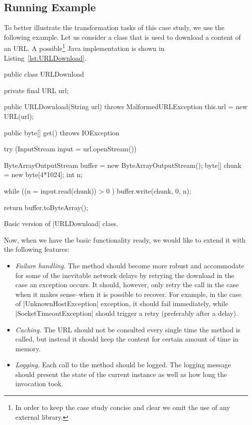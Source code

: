 \subsection{Running Example}

To better illustrate the transformation tasks of this case study, we use the following example.
Let us consider a class that is used to download a content of an URL.
A possible\footnote{In order to keep the case study concise and clear we omit the use of any external library.} Java implementation is shown in Listing~\ref{lst:URLDownload}.

\begin{listing}[H]
  \begin{javacode}
  public class URLDownload {
    private final URL url;

    public URLDownload(String url) throws MalformedURLException {
      this.url = new URL(url);
    }

    public byte[] get() throws IOException {
      try (InputStream input = url.openStream()) {

        ByteArrayOutputStream buffer = new ByteArrayOutputStream();
        byte[] chunk = new byte[4*1024];
        int n;

        while ((n = input.read(chunk)) > 0 ) {
          buffer.write(chunk, 0, n);
        }

        return buffer.toByteArray();
      }
    }
  }
  \end{javacode}
  \caption{Basic version of \javainline|URLDownload| class.}
  \label{lst:URLDownload}
\end{listing}

Now, when we have the basic functionality ready, we would like to extend it with the following features:

\begin{itemize}[--]
   \item \emph{Failure handling.} The method should become more robust and accommodate for some of the inevitable network delays by retrying the download in the case an exception occurs.
   It should, however, only retry the call in the case when it makes sense--\Ie when it is possible to recover.
   For example, in the case of \javainline|UnknownHostException| exception, it should fail immediately, while \javainline|SocketTimeoutException| should trigger a retry (preferably after a delay).
   \item \emph{Caching.} The URL should not be consulted every single time the method is called, but instead it should keep the content for certain amount of time in memory.
   \item \emph{Logging.} Each call to the method should be logged.
   The logging message should present the state of the current instance as well as how long the invocation took.
\end{itemize} 

